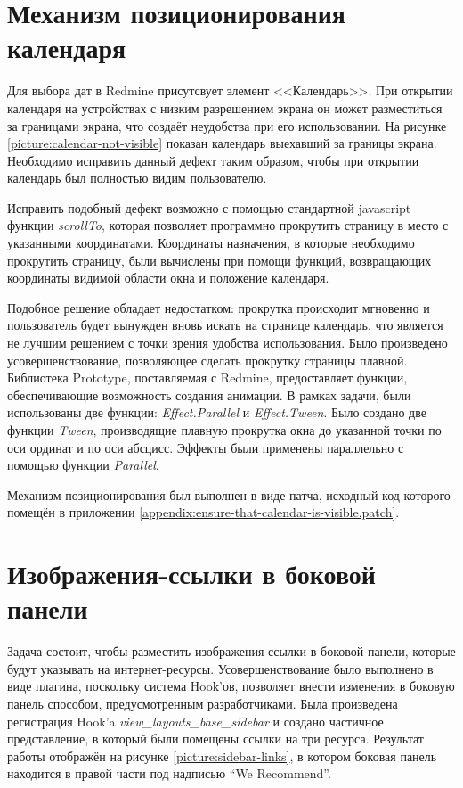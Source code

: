 \section{Механизм позиционирования календаря}
Для выбора дат в Redmine присутсвует элемент <<Календарь>>. При открытии
календаря на устройствах с низким разрешением экрана он может разместиться за
границами экрана, что создаёт неудобства при его использовании. На рисунке
\ref{picture:calendar-not-visible} показан календарь выехавший за границы
экрана. Необходимо исправить данный дефект таким образом, чтобы при открытии
календарь был полностью видим пользователю.

Исправить подобный дефект возможно с помощью стандартной javascript
функции \textit{scrollTo}, которая позволяет программно прокрутить
страницу в место с указанными координатами. Координаты назначения, в которые
необходимо прокрутить страницу, были вычислены при помощи функций,
возвращающих координаты видимой области окна и положение календаря.

Подобное решение обладает недостатком: прокрутка происходит мгновенно и
пользователь будет вынужден вновь искать на странице календарь, что является не
лучшим решением с точки зрения удобства использования. Было произведено
усовершенствование, позволяющее сделать прокрутку страницы плавной.
Библиотека Prototype, поставляемая с Redmine, предоставляет функции,
обеспечивающие возможность создания анимации. В рамках задачи, были
использованы две функции: \textit{Effect.Parallel} и \textit{Effect.Tween}.
Было создано две функции \textit{Tween}, производящие плавную прокрутка окна до
указанной точки по оси ординат и по оси абсцисс. Эффекты были применены
параллельно с помощью функции \textit{Parallel}.

Механизм позиционирования был выполнен в виде патча, исходный код
которого помещён в приложении
\ref{appendix:ensure-that-calendar-is-visible.patch}.

\section{Изображения-ссылки в боковой панели}
Задача состоит, чтобы разместить изображения-ссылки в боковой панели, которые
будут указывать на интернет-ресурсы. Усовершенствование было выполнено в виде плагина, поскольку система Hook'ов,
позволяет внести изменения в боковую панель способом, предусмотренным
разработчиками. Была произведена регистрация Hook'a
\textit{view\_layouts\_base\_sidebar} и создано частичное представление, в
который были помещены ссылки на три ресурса. Результат работы отображён на
рисунке \ref{picture:sidebar-links}, в котором боковая панель находится в
правой части под надписью ``We Recommend''.



